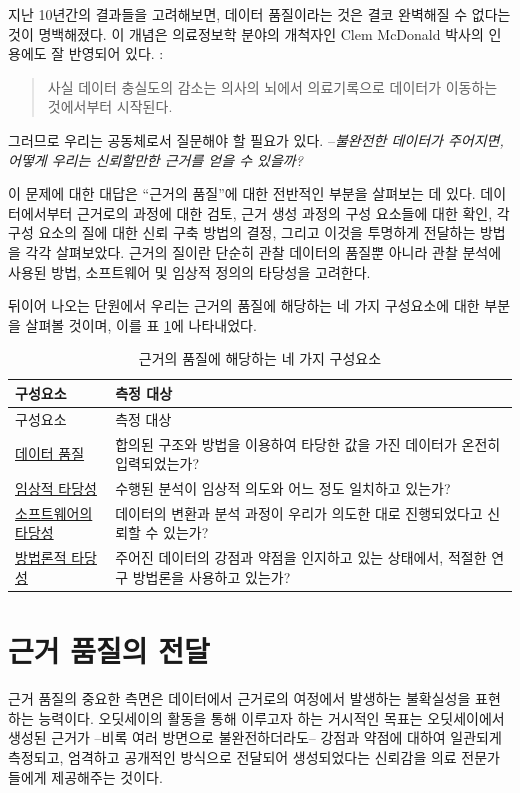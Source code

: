 \documentclass[11pt]{book}
\theoremstyle{definition}
\theoremstyle{definition}
\theoremstyle{definition}
\theoremstyle{remark}
\begin{document}
지난 10년간의 결과들을 고려해보면, 데이터 품질이라는 것은 결코 완벽해질
수 없다는 것이 명백해졌다. 이 개념은 의료정보학 분야의 개척자인 Clem
McDonald 박사의 인용에도 잘 반영되어 있다. :

\begin{quote}
사실 데이터 충실도의 감소는 의사의 뇌에서 의료기록으로 데이터가 이동하는
것에서부터 시작된다. 
\end{quote}

그러므로 우리는 공동체로서 질문해야 할 필요가 있다. --\emph{불완전한
데이터가 주어지면, 어떻게 우리는 신뢰할만한 근거를 얻을 수 있을까?}

이 문제에 대한 대답은 ``근거의 품질''에 대한 전반적인 부분을 살펴보는 데
있다. 데이터에서부터 근거로의 과정에 대한 검토, 근거 생성 과정의 구성
요소들에 대한 확인, 각 구성 요소의 질에 대한 신뢰 구축 방법의 결정,
그리고 이것을 투명하게 전달하는 방법을 각각 살펴보았다. 근거의 질이란
단순히 관찰 데이터의 품질뿐 아니라 관찰 분석에 사용된 방법, 소프트웨어
및 임상적 정의의 타당성을 고려한다. 

뒤이어 나오는 단원에서 우리는 근거의 품질에 해당하는 네 가지 구성요소에
대한 부분을 살펴볼 것이며, 이를 표 \ref{tab:evidenceQuality}에
나타내었다.

\begin{longtable}[]{@{}ll@{}}
\caption{\label{tab:evidenceQuality} 근거의 품질에 해당하는 네 가지
구성요소}\tabularnewline
\toprule
구성요소 & 측정 대상\tabularnewline
\midrule
\endfirsthead
\toprule
구성요소 & 측정 대상\tabularnewline
\midrule
\endhead
\href{DataQuality.html}{데이터 품질} & 합의된 구조와 방법을 이용하여
타당한 값을 가진 데이터가 온전히 입력되었는가?\tabularnewline
\href{ClinicalValidity.html}{임상적 타당성} & 수행된 분석이 임상적
의도와 어느 정도 일치하고 있는가?\tabularnewline
\href{SoftwareValidity.html}{소프트웨어의 타당성} & 데이터의 변환과 분석
과정이 우리가 의도한 대로 진행되었다고 신뢰할 수 있는가?\tabularnewline
\href{MethodValidity.html}{방법론적 타당성} & 주어진 데이터의 강점과
약점을 인지하고 있는 상태에서, 적절한 연구 방법론을 사용하고
있는가?\tabularnewline
\bottomrule
\end{longtable}

\section{근거 품질의 전달}\label{--}

근거 품질의 중요한 측면은 데이터에서 근거로의 여정에서 발생하는
불확실성을 표현하는 능력이다. 오딧세이의 활동을 통해 이루고자 하는
거시적인 목표는 오딧세이에서 생성된 근거가 --비록 여러 방면으로
불완전하더라도-- 강점과 약점에 대하여 일관되게 측정되고, 엄격하고
공개적인 방식으로 전달되어 생성되었다는 신뢰감을 의료 전문가들에게
제공해주는 것이다.
\end{document}

